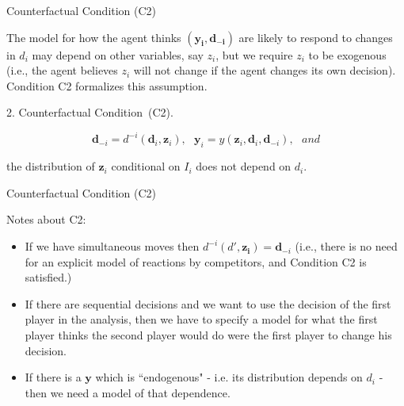 \begin{frame}{Counterfactual Condition (C2)}

The model for how the agent thinks $(\symbf{y_i, d_{-i}})$ are likely to
respond to changes in $d_i$ may depend on other variables, say $z_i$, but we require $z_i$ to be exogenous (i.e., the agent believes $z_i$ will not change if the agent changes its own
decision). Condition C2 formalizes this assumption.

\vspace{0.2in}

2. Counterfactual Condition\ (C2).

\begin{equation*}
\symbf{d}_{-i}=d^{-i}(\symbf{d}_{i},\symbf{z}_{i}),\text{ \ }\symbf{y}%
_{i}=y(\symbf{z}_{i},\symbf{d}_{i},\symbf{d}_{-i}),\text{ }and
\end{equation*}

the distribution of $\symbf{z}_{i}$ conditional on $\mathit{I}_{i}$ does
not depend on $d_{i}$.

\end{frame}

\begin{frame}{Counterfactual Condition (C2)}

Notes about C2:

\begin{itemize}


\item If we have simultaneous moves then $d^{-i}(d',\symbf{z_i}) = \symbf{d}_{-i}$ (i.e., there is no need for an explicit model of reactions by competitors, and Condition C2 is satisfied.)

\item If there are sequential decisions and we want to use the decision of the first player in the analysis,
then we have to specify a model for what the first player
thinks the second player would do were the first player to
change his decision.

\item If there is a $\symbf{y}$ which is ``endogenous" - i.e. its distribution depends on $d_{i}$ - then we
need a model of that dependence.
\end{itemize}

\end{frame}

